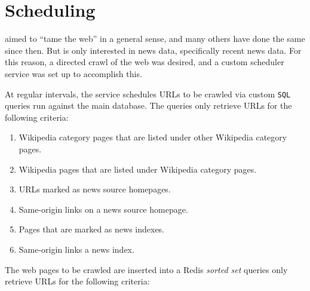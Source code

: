 \section{Scheduling}

 aimed to ``tame the web'' in
a general sense, and many others have done the same since then.
But \nr{} is only interested in news data, specifically
recent news data.  For this reason, a directed crawl of the web
was desired, and a custom scheduler service was set up to
accomplish this.

At regular intervals, the service schedules URLs to be crawled via
custom {\tt SQL} queries run against the main database.  The
queries only retrieve URLs for the following criteria:

\begin{enumerate}
    \item Wikipedia category pages that are listed under other Wikipedia
          category pages.
    \item Wikipedia pages that are listed under Wikipedia category pages.
    \item URLs marked as news source homepages.
    \item Same-origin links on a news source homepage.
    \item Pages that are marked as news indexes.
    \item Same-origin links a news index.
\end{enumerate}

The web pages to be crawled are inserted into a Redis
{\it sorted set}
queries only retrieve URLs for the following criteria:
